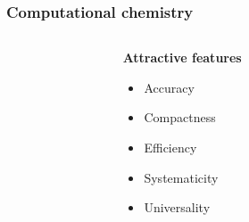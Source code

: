 \begin{frame}
    \frametitle{Computational chemistry}
    \begin{columns}
    \begin{column}{.10\textwidth}
    \end{column}
    \begin{column}{.30\textwidth}
    \textbf{Attractive features}
    \begin{itemize}
        \item Accuracy
        \item Compactness
        \item Efficiency
        \item Systematicity
        \item Universality
    \end{itemize}
    \end{column}
    \begin{column}{.60\textwidth}

    \vspace{5mm}

    \end{column}
    \end{columns}    

    \vspace{40.2mm}

\end{frame}

